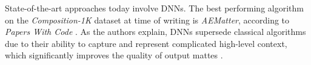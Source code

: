 \documentclass{article}
\theoremstyle{definition}
\begin{document}
\begin{multicols}{2}[]
State-of-the-art approaches today involve DNNs. The best performing algorithm on the \emph{Composition-1K} dataset at time of writing is \emph{AEMatter}, according to \emph{Papers With Code} \cite{web:papers-with-code}. As the authors explain, DNNs supersede classical algorithms due to their ability to capture and represent complicated high-level context, which significantly improves the quality of output mattes \cite{sota-composition-1k}.




\end{multicols}
\end{document}
